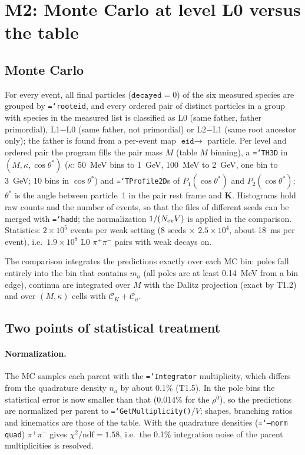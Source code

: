 \documentclass[11pt,a4paper]{article}
\newcommand{\CK}{\mathcal C_K}
\newcommand{\Cu}{\mathcal C_u}
\newcommand{\code}[1]{\texttt{\hyphenchar\font=`\-#1}}
\begin{document}
\section{M2: Monte Carlo at level L0 versus the table}

\subsection{Monte Carlo}
For every event, all final particles ($\texttt{decayed}=0$) of the six measured species are
grouped by \code{rooteid}, and every ordered pair of distinct particles in a group with species in
the measured list is classified as L0 (same father, father primordial), L1$-$L0 (same father, not
primordial) or L2$-$L1 (same root ancestor only); the father is found from a per-event map
$\texttt{eid}\to$ particle. Per level and ordered pair the program fills the pair mass $M$ (table
$M$ binning), a \code{TH3D} in $(M,\kappa,\cos\theta^*)$ ($\kappa$: 50~MeV bins to 1~GeV, 100~MeV
to 2~GeV, one bin to 3~GeV; 10 bins in $\cos\theta^*$) and \code{TProfile2D}s of
$P_1(\cos\theta^*)$ and $P_2(\cos\theta^*)$; $\theta^*$ is the angle between particle~1 in the pair
rest frame and $\mathbf K$. Histograms hold raw counts and the number of events, so that the files
of different seeds can be merged with \code{hadd}; the normalization $1/(N_{\rm ev}V)$ is applied in
the comparison. Statistics: $2\times10^5$ events per weak setting (8 seeds $\times$ $2.5\times10^4$,
about 18~ms per event), i.e.\ $1.9\times10^8$ L0 $\pi^+\pi^-$ pairs with weak decays on.

The comparison integrates the predictions exactly over each MC bin: poles fall entirely into the
bin that contains $m_a$ (all poles are at least 0.14~MeV from a bin edge), continua are integrated
over $M$ with the Dalitz projection (exact by T1.2) and over $(M,\kappa)$ cells with $\CK+\Cu$.

\subsection{Two points of statistical treatment}\label{sec:m2notes}
\paragraph{Normalization.} The MC samples each parent with the \code{Integrator} multiplicity,
which differs from the quadrature density $n_a$ by about 0.1\% (T1.5). In the pole bins the
statistical error is now smaller than that (0.014\% for the $\rho^0$), so the predictions are
normalized per parent to \code{GetMultiplicity()}$/V$; shapes, branching ratios and kinematics are
those of the table. With the quadrature densities (\code{--norm quad}) $\pi^+\pi^-$ gives
$\chi^2/\text{ndf}=1.58$, i.e.\ the 0.1\% integration noise of the parent multiplicities is
resolved.
\end{document}
